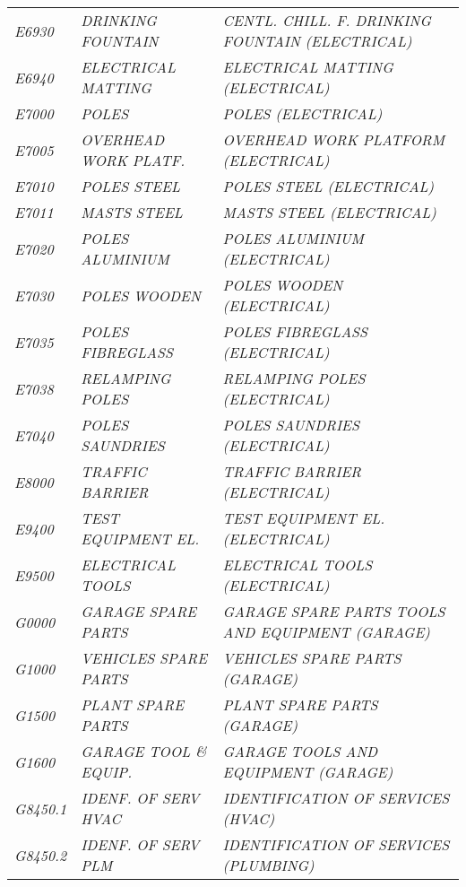 \begin{landscape}
\begin{longtable}[l]{l%
                  l|%
                  l|}
\itshape E6930       &\itshape DRINKING FOUNTAIN   &\itshape CENTL. CHILL. F. DRINKING FOUNTAIN (ELECTRICAL)   \\
\itshape E6940       &\itshape ELECTRICAL MATTING   &\itshape ELECTRICAL MATTING (ELECTRICAL)   \\
\itshape E7000       &\itshape POLES   &\itshape POLES (ELECTRICAL)   \\
\itshape E7005       &\itshape OVERHEAD WORK PLATF.   &\itshape OVERHEAD WORK PLATFORM (ELECTRICAL)   \\
\itshape E7010       &\itshape POLES STEEL   &\itshape POLES STEEL (ELECTRICAL)   \\
\itshape E7011       &\itshape MASTS STEEL   &\itshape MASTS STEEL (ELECTRICAL)   \\
\itshape E7020       &\itshape POLES ALUMINIUM   &\itshape POLES ALUMINIUM (ELECTRICAL)   \\
\itshape E7030       &\itshape POLES WOODEN   &\itshape POLES WOODEN (ELECTRICAL)   \\
\itshape E7035       &\itshape POLES FIBREGLASS   &\itshape POLES FIBREGLASS (ELECTRICAL)   \\
\itshape E7038       &\itshape RELAMPING POLES   &\itshape RELAMPING POLES (ELECTRICAL)   \\
\itshape E7040       &\itshape POLES SAUNDRIES   &\itshape POLES SAUNDRIES (ELECTRICAL)   \\
\itshape E8000       &\itshape TRAFFIC BARRIER   &\itshape TRAFFIC BARRIER (ELECTRICAL)   \\
\itshape E9400       &\itshape TEST EQUIPMENT EL.   &\itshape TEST EQUIPMENT EL. (ELECTRICAL)   \\
\itshape E9500       &\itshape ELECTRICAL TOOLS   &\itshape ELECTRICAL TOOLS (ELECTRICAL)   \\
\itshape G0000       &\itshape GARAGE SPARE PARTS   &\itshape GARAGE SPARE PARTS TOOLS AND EQUIPMENT (GARAGE)   \\
\itshape G1000       &\itshape VEHICLES SPARE PARTS   &\itshape VEHICLES SPARE PARTS (GARAGE)   \\
\itshape G1500       &\itshape PLANT SPARE PARTS   &\itshape PLANT SPARE PARTS (GARAGE)   \\
\itshape G1600       &\itshape GARAGE TOOL \& EQUIP.   &\itshape GARAGE TOOLS AND EQUIPMENT (GARAGE)   \\
\itshape G8450.1     &\itshape IDENF. OF SERV HVAC   &\itshape IDENTIFICATION OF SERVICES (HVAC)   \\
\itshape G8450.2     &\itshape IDENF. OF SERV PLM   &\itshape IDENTIFICATION OF SERVICES (PLUMBING)   \\

\end{longtable}
\end{landscape}
